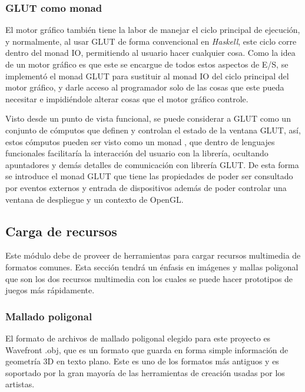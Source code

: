 \subsubsection{GLUT como monad}

El motor gráfico también tiene la labor de manejar el ciclo principal de ejecución, y normalmente, al usar GLUT de forma convencional en \emph{Haskell}, este ciclo corre dentro del monad IO, permitiendo al usuario hacer cualquier cosa. Como la idea de un motor gráfico es que este se encargue de todos estos aspectos de E/S, se implementó el monad GLUT para sustituir al monad IO del ciclo principal del motor gráfico, y darle acceso al programador solo de las cosas que este pueda necesitar e impidiéndole alterar cosas que el motor gráfico controle.

Visto desde un punto de vista funcional, se puede considerar a GLUT como  un conjunto de cómputos que definen y controlan el estado de la ventana GLUT, así, estos cómputos pueden ser visto como un monad \cite{moggi1991notions} \cite{wiki:MonadsComputation} \cite{wiki:MonadsContainers}, que dentro de lenguajes funcionales facilitaría la interacción del usuario con la librería, ocultando apuntadores y demás detalles de comunicación con librería GLUT. De esta forma se introduce el monad GLUT que tiene las propiedades de poder ser consultado por eventos externos y entrada de dispositivos además de poder controlar una ventana de despliegue y un contexto de OpenGL.

\subsection{Carga de recursos}

Este módulo debe de proveer de herramientas para cargar recursos multimedia de formatos comunes. Esta sección tendrá un énfasis en imágenes y mallas poligonal que son los dos recursos multimedia con los cuales se puede hacer prototipos de juegos más rápidamente.

\subsubsection{Mallado poligonal}

El formato de archivos de mallado poligonal elegido para este proyecto es Wavefront .obj, que es un formato que guarda en forma simple información de geometría 3D en texto plano. Este es uno de los formatos más antiguos y es soportado por la gran mayoría de las herramientas de creación usadas por los artistas.

